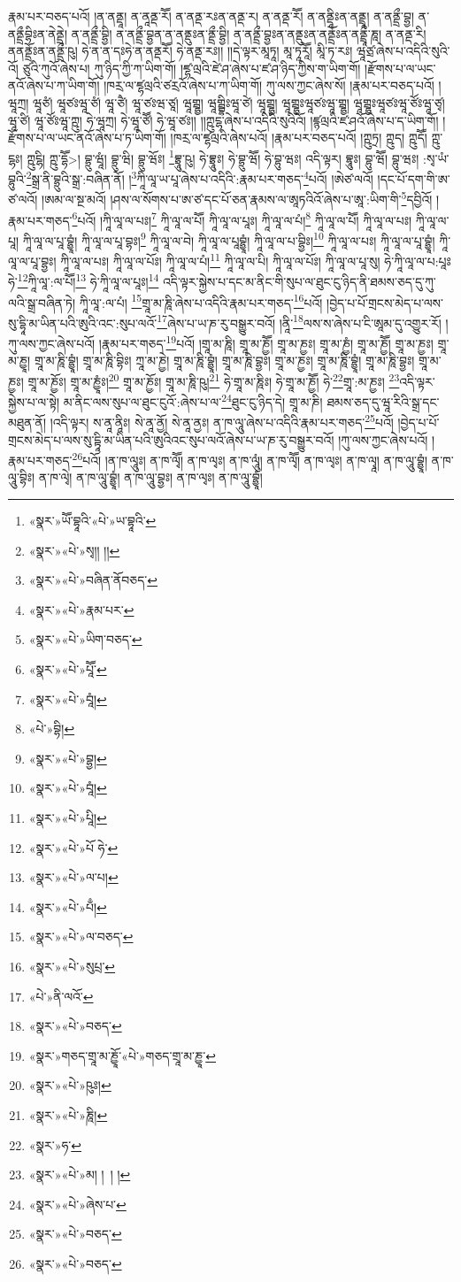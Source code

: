 རྣམ་པར་བཅད་པའོ། །ན་ནནྡཱ། ན་ནཱནྡ་རཽ། ན་ནནྡ་རཿན་ནནྡ་ར། ན་ནནྡ་རཽ། ན་ནནྡཱིཿན་ནནྡྲཱ། ན་ནནྡྲྀ་བྷྱ། ན་ནནྡྲྀབྷིཿན་ནེནྡྲེ། ན་ནནྡྲྀ་བྷྱི། ན་ནནྡྲྀ་བྷྱན་ན་ནནྡུཿན་ནྡྲྀ་བྷྱི། ན་ནནྡྲྀ་བྷྱཿན་ནནྡུཿན་ནནྡྲོཿན་ནནྡྲཱྀ་ཎཱ། ན་ནནྡ་རི། ནནནྡྲོཿན་ནནྡྲྀ་ཥུ། ཧེ་ན་ན་དཿཧེ་ན་ནནྡརཽ། ཧེ་ནནྡ་རཿ།། །།དེ་ལྟར་མཱཏཱ། མཱ་ཏཱརཱཽ། མཱི་ཏ་རཿ། ཝཱཙྲ་ཞེས་པ་འདིའི་སུའི་འོ། ཙུའི་ཀུའོ་ཞེས་པ། ཀུ་ཉིད་ཀྱི་ཀ་ཡིག་གོ། །ཛྷ་ལྲའི་ཛེ་ཤ་ཞེས་པ་ཛ་ཤ་ཉིད་ཀྱིས་ག་ཡིག་གོ། །རྫོགས་པ་ལ་ཡང་ནའོ་ཞེས་པ་ཀ་ཡིག་གོ། །ཁརྲ་ལ་ཛྷལྲའི་ཙརྲའོ་ཞེས་པ་ཀ་ཡིག་གོ། ཀུ་ལས་ཀྱང་ཞེས་སོ། །རྣམ་པར་བཅད་པའོ། །ཝཱཀྲ། ཝཱཙཾ། ཝཱཙཿཝཱ་ཙཾ། ཝཱ་ཙཻ། ཝཱ་ཙཿཝ་ཙཱ། ཝཱགྦྷྱ། ཝཱགྦྷིཿཝཱ་ཙེ། ཝཱགྦྷྱ། ཝཱགྦྷྱཿཝཱཙཿཝཱ་གྦྷྱ། ཝཱགྦྷྱཿཝཱཙཿཝཱ་ཙོཿཝཱ་ཙྭ། ཝཱ་ཙི། ཝཱ་ཙོཿཝཱ་ཀྵུ། ཧེ་ཝཱཀྲ། ཧེ་ཝཱ་ཙཽ། ཧེ་ཝཱ་ཙཿ།། །།ཀྵུངྷ་ཞེས་པ་འདིའི་སུའིའོ། །ཛྙལྲའི་ཛ་ཤའོ་ཞེས་པ་ད་ཡིག་གོ། །རྫོགས་པ་ལ་ཡང་ནའོ་ཞེས་པ་ཏ་ཡིག་གོ། །ཁརྲ་ལ་ཛྷལྲའི་ཞེས་པའོ། །རྣམ་པར་བཅད་པའོ། །ཀྵུཏྲ། ཀྵུད། ཀྵུདཽ། ཀྵུ་ངྷཿ། ཀྵུངྷི། ཀྵུ་དྷཽ>། བྷྲུ་ཝཱཾ། བྷྲུ་ཝི། བྷྲུ་ཝོཿ། \footnote{«སྣར་»ཡཽ་བྷཱའི་«པེ་»ཡ་བྷཱའི་}བྷྲཱུ་ཥུ། ཧེ་བྷྲཱུཿ། ཧེ་བྷྲུ་ཝཽ། ཧེ་བྷུ་ཝཿ། འདི་ལྟར། བྷཱུཿ། བྷུ་ཝཽ། བྷུ་ཝཿ། :སྭ་ཡཾ་བྷུའི་\footnote{«སྣར་»«པེ་»སྭ།། །།}སྒྲ་ནི་བྷྲུའི་སྒྲ་:བཞིན་ནོ། །\footnote{«སྣར་»«པེ་»བཞིན་ནོབཅད་}ཀཱི་ལཱ་ཡ་པཱ་ཞེས་པ་འདིའི་:རྣམ་པར་གཅད་\footnote{«སྣར་»«པེ་»རྣམ་པར་}པའོ། །ཨེཙ་ལའོ། །དང་པོ་དག་གི་ཨ་ཙ་ལའོ། །ཨམ་ལ་སྔ་མའོ། །ཤས་ལ་སོགས་པ་ཨ་ཙ་དང་པོ་ཅན་རྣམས་ལ་ཨཱཏའིའོ་ཞེས་པ་ཨཱ་:ཡིག་གི་\footnote{«སྣར་»«པེ་»ཡིག་བཅད་}དབྱིའོ། །རྣམ་པར་གཅད་\footnote{«སྣར་»«པེ་»པཱཽ་}པའོ། །ཀཱི་ལཱ་ལ་པཿ།\footnote{«སྣར་»«པེ་»བཱཾ།} ཀཱི་ལཱ་ལ་པཽ། ཀཱི་ལཱ་ལ་པཱཿ། ཀཱི་ལཱ་ལ་པཾ།\footnote{«པེ་»བྷི།} ཀཱི་ལཱ་ལ་པཽ། ཀཱི་ལཱ་ལ་པཿ། ཀཱི་ལཱ་ལ་པཱ། ཀཱི་ལཱ་ལ་པཱ་བྷྱཱཾ། ཀཱི་ལཱ་ལ་པཱ་བྷཿ།\footnote{«སྣར་»«པེ་»བྷྱ།} ཀཱི་ལཱ་ལ་བེ། ཀཱི་ལཱ་ལ་པཱབྷྱཱཾ། ཀཱི་ལཱ་ལ་པ་བྷྱིཿ།\footnote{«སྣར་»«པེ་»བཱཾ།} ཀཱི་ལཱ་ལ་པཿ། ཀཱི་ལཱ་ལ་པཱ་བྷྱཱཾ། ཀཱི་ལཱ་ལ་པཱ་བྷྱཿ། ཀཱི་ལཱ་ལ་པཿ། ཀཱི་ལཱ་ལ་པོཿ། ཀཱི་ལཱ་ལ་པཾ།\footnote{«སྣར་»«པེ་»པཱི།} ཀཱི་ལཱ་ལ་པི། ཀཱི་ལཱ་ལ་པོཿ། ཀཱི་ལཱ་ལ་པཱ་སུ། ཧེ་ཀཱི་ལཱ་ལ་པ:པཱཿཧེ་\footnote{«སྣར་»«པེ་»པོ ཧེ་}ཀཱི་ལཱ་:ལ་པཽ།\footnote{«སྣར་»«པེ་»ལ་པ།} ཧེ་ཀཱི་ལཱ་ལ་པཱཿ།\footnote{«སྣར་»«པེ་»པྃ།} འདི་ལྟར་སྐྱེས་པ་དང་མ་ནིང་གི་སུཔ་ལ་ཐུང་ངུ་ཉིད་ནི་ཐམས་ཅད་དུ་ཀུ་ལའི་སྒྲ་བཞིན་ཏེ། ཀཱི་ལཱ་:ལ་པཾ། \footnote{«སྣར་»«པེ་»ལ་བཅད་}གྲཱ་མ་ཎཱི་ཞེས་པ་འདིའི་རྣམ་པར་གཅད་\footnote{«སྣར་»«པེ་»སུཔྲ་}པའོ། །བྱེད་པ་པོ་གྲངས་མེད་པ་ལས་སུ་དྷཱི་མ་ཡིན་པའི་ཨུའི་འང་:སུཔ་ལའོ་\footnote{«པེ་»ནི་ལའོ་}ཞེས་པ་ཡ་ཎ་རུ་བསྒྱུར་བའོ། །ནཱི་\footnote{«སྣར་»«པེ་»བཅད་}ལས་ས་ཞེས་པ་ངི་ཨཱམ་དུ་འགྱུར་རོ། །ཀུ་ལས་ཀྱང་ཞེས་པའོ། །རྣམ་པར་གཅད་\footnote{«སྣར་»གཅད་གྲཱ་མ་ཎྱཱོ་«པེ་»གཅད་གྲཱ་མ་ཎྱཱ་}པའོ། །གྲཱ་མ་ཎཱི། གྲཱ་མ་ཎྱཽ། གྲཱ་མ་ཎྱཿ། གྲཱ་མ་ཎྱཾ། གྲཱ་མ་ཎྱཽ། གྲཱ་མ་ཎྱཿ། གྲཱ་མ་ཎྱཱ། གྲཱ་མ་ཎཱི་བྷྱཱཾ། གྲཱ་མ་ཎཱི་བྷིཿ། ཀྲཱ་མ་ཎྱེ། གྲཱ་མ་ཎཱི་བྷྱཱཾ། གྲཱ་མ་ཎཱི་བྷྱཿ། གྲཱ་མ་ཎྱཿ། གྲཱ་མ་ཎཱི་བྷྱཱཾ། གྲཱ་མ་ཎཱི་བྷྱཿ། གྲཱ་མ་ཎྱཿ། གྲཱ་མ་ཎྱོཿ། གྲཱ་མ་ཎྱཱཾཿ།\footnote{«སྣར་»«པེ་»ཥུཿ།} གྲཱ་མ་ཎྱོཿ། གྲཱ་མ་ཎཱི་ཥུ།\footnote{«སྣར་»«པེ་»ཎཱི།} ཧེ་གྲཱ་མ་ཎཱིཿ། ཧེ་གྲཱ་མ་ཎྱཽ། ཧེ་\footnote{«སྣར་»ཧ་}གྲཱ་:མ་ཎྱཿ། \footnote{«སྣར་»«པེ་»མ། ། ། ། }འདི་ལྟར་སྐྱེས་པ་ལ་སྟེ། མ་ནིང་ལས་སུཔ་ལ་ཐུང་ངུའོ་:ཞེས་པ་ལ་\footnote{«སྣར་»«པེ་»ཞེས་པ་}ཐུང་ངུ་ཉིད་དེ། གྲཱ་མ་ཎི། ཐམས་ཅད་དུ་ཝཱ་རིའི་སྒྲ་དང་མཐུན་ནོ། །འདི་ལྟར། ས་ནཱ་ནཱིཿ། སེ་ནཱ་ནྱོ། སེ་ནཱ་ནྱཿ། ན་ཁ་ལཱུ་ཞེས་པ་འདིའི་རྣམ་པར་གཅད་\footnote{«སྣར་»«པེ་»བཅད་}པའོ། །བྱེད་པ་པོ་གྲངས་མེད་པ་ལས་སུ་དྟཱི་མ་ཡིན་པའི་ཨུའིའང་སུཔ་ལའོ་ཞེས་པ་ཡ་ཎ་རུ་བསྒྱུར་བའོ། །ཀུ་ལས་ཀྱང་ཞེས་པའོ། །རྣམ་པར་གཅད་\footnote{«སྣར་»«པེ་»བཅད་}པའོ། །ན་ཁ་ལཱུཿ། ན་ཁ་ལྭཽ། ན་ཁ་ལྭཿ། ན་ཁ་ལཱུཾ། ན་ཁ་ལྭཽ། ན་ཁ་ལྭཿ། ན་ཁ་ལྭཱ། ན་ཁ་ལཱུ་བྷྱཱཾ། ན་ཁ་ལཱུ་བྷིཿ། ན་ཁ་ལྭེ། ན་ཁ་ལཱུ་བྷྱཱཾ། ན་ཁ་ལཱུ་བྷྱཿ། ན་ཁ་ལྭཿ། ན་ཁ་ལཱུ་བྷྱཱཾ། 